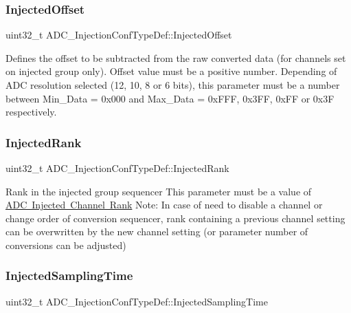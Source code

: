 \subsubsection{\texorpdfstring{InjectedOffset}{InjectedOffset}}
{\footnotesize\ttfamily uint32\+\_\+t A\+D\+C\+\_\+\+Injection\+Conf\+Type\+Def\+::\+Injected\+Offset}

Defines the offset to be subtracted from the raw converted data (for channels set on injected group only). Offset value must be a positive number. Depending of A\+DC resolution selected (12, 10, 8 or 6 bits), this parameter must be a number between Min\+\_\+\+Data = 0x000 and Max\+\_\+\+Data = 0x\+F\+FF, 0x3\+FF, 0x\+FF or 0x3F respectively. \mbox{\label{struct_a_d_c___injection_conf_type_def_af8a1717c0f5a5d0c7a705224f28a844f}} 
\subsubsection{\texorpdfstring{InjectedRank}{InjectedRank}}
{\footnotesize\ttfamily uint32\+\_\+t A\+D\+C\+\_\+\+Injection\+Conf\+Type\+Def\+::\+Injected\+Rank}

Rank in the injected group sequencer This parameter must be a value of \mbox{\hyperlink{group___a_d_c_ex__injected__rank}{A\+DC Injected Channel Rank}} Note\+: In case of need to disable a channel or change order of conversion sequencer, rank containing a previous channel setting can be overwritten by the new channel setting (or parameter number of conversions can be adjusted) \mbox{\label{struct_a_d_c___injection_conf_type_def_a3d15c0590dbafc9e99e21ea4df5b0c6b}} 
\subsubsection{\texorpdfstring{InjectedSamplingTime}{InjectedSamplingTime}}
{\footnotesize\ttfamily uint32\+\_\+t A\+D\+C\+\_\+\+Injection\+Conf\+Type\+Def\+::\+Injected\+Sampling\+Time}

